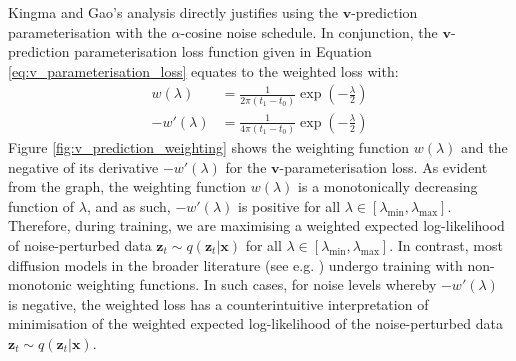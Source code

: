 \documentclass[ oneside,%
                    author={George Herbert},
                    degree={MSci},
                     title={Diffusion Models for Time-Evolving Precipitation Fields},
                  subtitle={}]{dissertation}
\begin{document}
Kingma and Gao's \cite{Understanding_Diffusion_Objective_Kingma} analysis directly justifies using the $\mathbf{v}$-prediction parameterisation with the $\alpha$-cosine noise schedule. In conjunction, the $\mathbf{v}$-prediction parameterisation loss function given in Equation \ref{eq:v_parameterisation_loss} equates to the weighted loss with:
\begin{align}
      w(\lambda)&=\frac{1}{2\pi(t_1-t_0)}\exp\left(-\frac{\lambda}{2}\right)\\
      -w'(\lambda)&=\frac{1}{4\pi(t_1-t_0)}\exp\left(-\frac{\lambda}{2}\right)
\end{align}
Figure \ref{fig:v_prediction_weighting} shows the weighting function $w(\lambda)$ and the negative of its derivative $-w'(\lambda)$ for the $\mathbf{v}$-parameterisation loss. As evident from the graph, the weighting function $w(\lambda)$ is a monotonically decreasing function of $\lambda$, and as such, $-w'(\lambda)$ is positive for all $\lambda\in [\lambda_{\min}, \lambda_{\max}]$. Therefore, during training, we are maximising a weighted expected log-likelihood of noise-perturbed data $\mathbf{z}_t\sim q(\mathbf{z}_t|\mathbf{x})$ for all $\lambda\in[\lambda_{\min}, \lambda_{\max}]$. In contrast, most diffusion models in the broader literature (see e.g. \cite{DDPM_Ho, IDDPM_Nichol,Imagen_Saharia}) undergo training with non-monotonic weighting functions. In such cases, for noise levels whereby $-w'(\lambda)$ is negative, the weighted loss has a counterintuitive interpretation of minimisation of the weighted expected log-likelihood of the noise-perturbed data $\mathbf{z}_t\sim q(\mathbf{z}_t|\mathbf{x})$.
\end{document}
